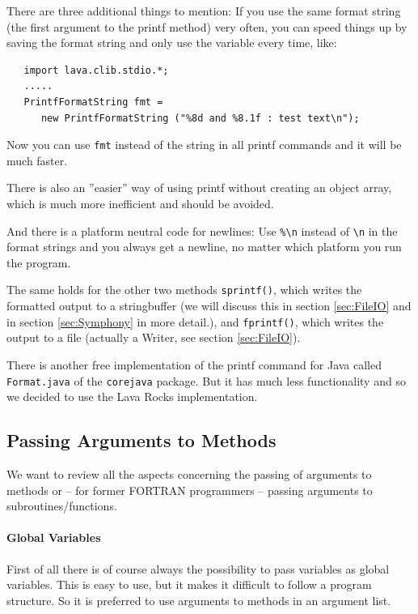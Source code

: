 There are three additional things to mention: 
If you use the
same format string (the first argument to the printf method) 
very often, you can speed things up by saving the format string
and only use the variable every time, like:
\begin{small}
\begin{verbatim}
   import lava.clib.stdio.*;
   .....
   PrintfFormatString fmt = 
      new PrintfFormatString ("%8d and %8.1f : test text\n");
\end{verbatim}
\end{small}
Now you can use \verb|fmt| instead of the string in all printf commands
and it will be much faster.

There is also an ''easier'' way of using printf without creating
an object array, which is much more inefficient and should be avoided.

And there is a platform neutral code for newlines: Use \verb|%\n| instead
of \verb|\n| in the format strings and you always get a newline,
no matter which platform you run the program.

The same holds for the other two methods \verb|sprintf()|, which writes
the formatted output to a stringbuffer (we will discuss this in section
\ref{sec:FileIO} and in section \ref{sec:Symphony} in more detail.),
and \verb|fprintf()|, which writes the output to a file (actually a
Writer, see section \ref{sec:FileIO}).

There is another free implementation of the printf command for
Java called \verb|Format.java| of the \verb|corejava| package.
But it has much less functionality and so we decided to use
the Lava Rocks implementation.

\subsection{Passing Arguments to Methods}
\label{sec:PassingArguments}
We want to review all the aspects concerning the passing of
arguments to methods or -- for former FORTRAN programmers --
passing arguments to subroutines/functions.

\paragraph{Global Variables}
First of all there is of course always the possibility to 
pass variables as global variables. This is easy to use,
but it makes it difficult to follow a program structure.
So it is preferred to use arguments to methods in an
argument list.

